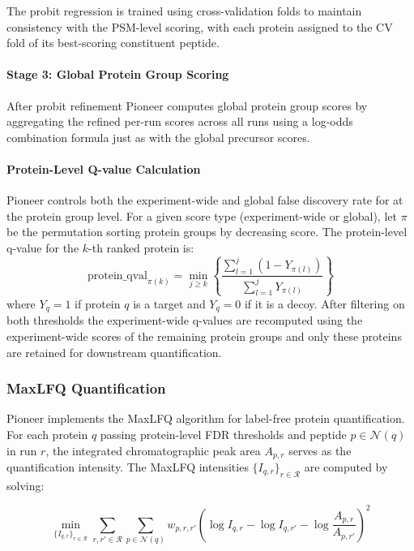 \documentclass[pdflatex,sn-nature]{sn-jnl}
\begin{document}
The probit regression is trained using cross-validation folds to maintain consistency with the PSM-level scoring, with each protein assigned to the CV fold of its best-scoring constituent peptide.

\paragraph{Stage 3: Global Protein Group Scoring}\label{para:stage3-global-protein-group-scoring} After probit refinement Pioneer computes global protein group scores by aggregating the refined per-run scores across all runs using a log-odds combination formula just as with the global precursor scores. 

\paragraph{Protein-Level Q-value Calculation}\label{para:protein-level-qvalue-calculation} Pioneer controls both the experiment-wide and global false discovery rate for at the protein group level. For a given score type (experiment-wide or global), let $\pi$ be the permutation sorting protein groups by decreasing score. The protein-level q-value for the $k$-th ranked protein is:
\begin{equation}
\text{protein\_qval}_{\pi(k)} = \min_{j \geq k} \left\{ \frac{\sum_{l=1}^{j} (1 - Y_{\pi(l)})}{\sum_{l=1}^{j} Y_{\pi(l)}} \right\}
\end{equation}
where $Y_q = 1$ if protein $q$ is a target and $Y_q = 0$ if it is a decoy. After filtering on both thresholds the experiment-wide q-values are recomputed using the experiment-wide scores of the remaining protein groups and only these proteins are retained for downstream quantification.


\subsubsection{MaxLFQ Quantification}\label{subsubsec:maxlfq-quantification}

Pioneer implements the MaxLFQ algorithm \cite{Cox2014} for label-free protein quantification. For each protein $q$ passing protein-level FDR thresholds and peptide $p \in \mathcal{N}(q)$ in run $r$, the integrated chromatographic peak area $A_{p,r}$ serves as the quantification intensity. The MaxLFQ intensities $\{I_{q,r}\}_{r \in \mathcal{R}}$ are computed by solving:

\begin{equation}
\min_{\{I_{q,r}\}_{r \in \mathcal{R}}} \sum_{r,r' \in \mathcal{R}} \sum_{p \in \mathcal{N}(q)} w_{p,r,r'} \left( \log I_{q,r} - \log I_{q,r'} - \log \frac{A_{p,r}}{A_{p,r'}} \right)^2
\end{equation}
\end{document}
